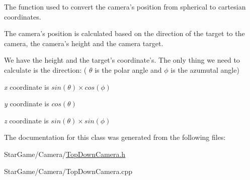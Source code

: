 The function used to convert the camera's position from spherical to cartesian coordinates. 

The camera's position is calculated based on the direction of the target to the camera, the camera's height and the camera target.

We have the height and the target's coordinate's. The only thing we need to calculate is the direction\-: ( $\theta$ is the polar angle and $\phi$ is the azumutal angle)
\begin{DoxyItemize}
\item {\itshape x} coordinate is $sin(\theta) \times cos(\phi)$
\item {\itshape y} coordinate is $cos(\theta)$
\item {\itshape z} coordinate is $sin(\theta) \times sin(\phi)$ 
\end{DoxyItemize}

The documentation for this class was generated from the following files\-:\begin{DoxyCompactItemize}
\item 
Star\-Game/\-Camera/\hyperlink{_top_down_camera_8h}{Top\-Down\-Camera.\-h}\item 
Star\-Game/\-Camera/Top\-Down\-Camera.\-cpp\end{DoxyCompactItemize}
